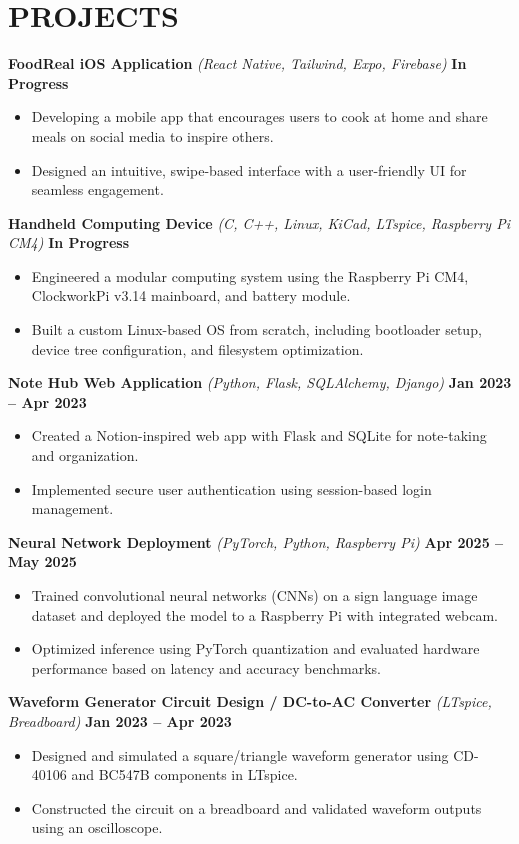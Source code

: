 \documentclass[letterpaper,11pt]{article}
\begin{document}
\section{PROJECTS}
\textbf{FoodReal iOS Application} \textit{(React Native, Tailwind, Expo, Firebase)} \hfill \textbf{In Progress} 
\begin{itemize}
    \item Developing a mobile app that encourages users to cook at home and share meals on social media to inspire others.
    \item Designed an intuitive, swipe-based interface with a user-friendly UI for seamless engagement.
\end{itemize}
\textbf{Handheld Computing Device} \textit{(C, C++, Linux, KiCad, LTspice, Raspberry Pi CM4)} \hfill \textbf{In Progress} 
\begin{itemize}
    \item Engineered a modular computing system using the Raspberry Pi CM4, ClockworkPi v3.14 mainboard, and battery module.
    \item Built a custom Linux-based OS from scratch, including bootloader setup, device tree configuration, and filesystem optimization.
\end{itemize}
\textbf{Note Hub Web Application} \textit{(Python, Flask, SQLAlchemy, Django)} \hfill \textbf{Jan 2023 -- Apr 2023} 
\begin{itemize}
    \item Created a Notion-inspired web app with Flask and SQLite for note-taking and organization.
    \item Implemented secure user authentication using session-based login management.
\end{itemize}
\textbf{Neural Network Deployment} \textit{(PyTorch, Python, Raspberry Pi)} \hfill \textbf{Apr 2025 -- May 2025} 
\begin{itemize}
    \item Trained convolutional neural networks (CNNs) on a sign language image dataset and deployed the model to a Raspberry Pi with integrated webcam.
    \item Optimized inference using PyTorch quantization and evaluated hardware performance based on latency and accuracy benchmarks.
\end{itemize}
\textbf{Waveform Generator Circuit Design / DC-to-AC Converter} \textit{(LTspice, Breadboard)} \hfill \textbf{Jan 2023 -- Apr 2023}
\begin{itemize}
    \item Designed and simulated a square/triangle waveform generator using CD-40106 and BC547B components in LTspice.
    \item Constructed the circuit on a breadboard and validated waveform outputs using an oscilloscope.
\end{itemize}
\end{document}
